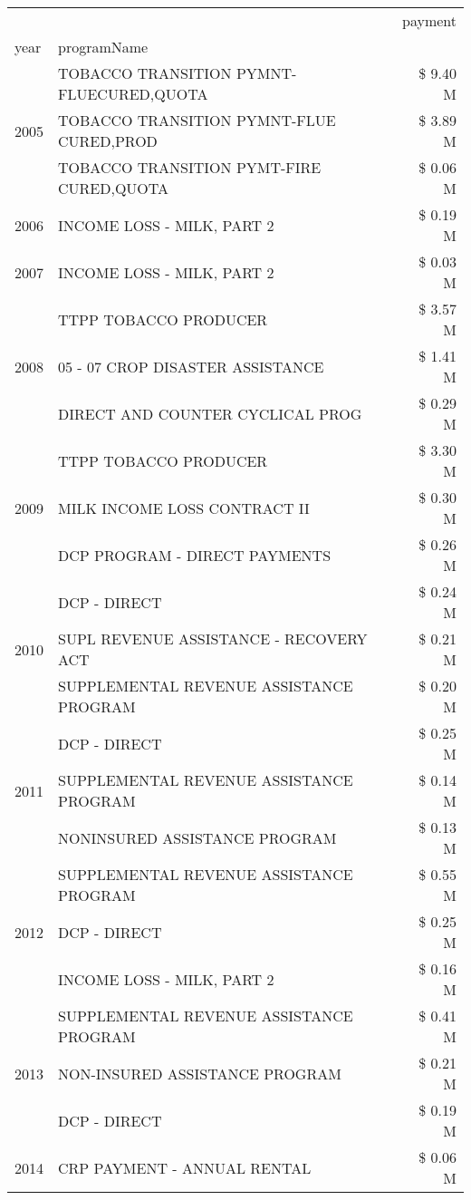 \begin{tabular}{llr}
\toprule
 &  & payment \\
year & programName &  \\
\midrule
\multirow[t]{3}{*}{2005} & TOBACCO TRANSITION PYMNT-FLUECURED,QUOTA & \$ 9.40 M \\
 & TOBACCO TRANSITION PYMNT-FLUE CURED,PROD & \$ 3.89 M \\
 & TOBACCO TRANSITION PYMT-FIRE CURED,QUOTA & \$ 0.06 M \\
\cline{1-3}
2006 & INCOME LOSS - MILK, PART 2 & \$ 0.19 M \\
\cline{1-3}
2007 & INCOME LOSS - MILK, PART 2 & \$ 0.03 M \\
\cline{1-3}
\multirow[t]{3}{*}{2008} & TTPP TOBACCO PRODUCER & \$ 3.57 M \\
 & 05 - 07 CROP DISASTER ASSISTANCE & \$ 1.41 M \\
 & DIRECT AND COUNTER CYCLICAL PROG & \$ 0.29 M \\
\cline{1-3}
\multirow[t]{3}{*}{2009} & TTPP TOBACCO PRODUCER & \$ 3.30 M \\
 & MILK INCOME LOSS CONTRACT II & \$ 0.30 M \\
 & DCP PROGRAM - DIRECT PAYMENTS & \$ 0.26 M \\
\cline{1-3}
\multirow[t]{3}{*}{2010} & DCP - DIRECT & \$ 0.24 M \\
 & SUPL REVENUE ASSISTANCE - RECOVERY ACT & \$ 0.21 M \\
 & SUPPLEMENTAL REVENUE ASSISTANCE PROGRAM & \$ 0.20 M \\
\cline{1-3}
\multirow[t]{3}{*}{2011} & DCP - DIRECT & \$ 0.25 M \\
 & SUPPLEMENTAL REVENUE ASSISTANCE PROGRAM & \$ 0.14 M \\
 & NONINSURED ASSISTANCE PROGRAM & \$ 0.13 M \\
\cline{1-3}
\multirow[t]{3}{*}{2012} & SUPPLEMENTAL REVENUE ASSISTANCE PROGRAM & \$ 0.55 M \\
 & DCP - DIRECT & \$ 0.25 M \\
 & INCOME LOSS - MILK, PART 2 & \$ 0.16 M \\
\cline{1-3}
\multirow[t]{3}{*}{2013} & SUPPLEMENTAL REVENUE ASSISTANCE PROGRAM & \$ 0.41 M \\
 & NON-INSURED ASSISTANCE PROGRAM & \$ 0.21 M \\
 & DCP - DIRECT & \$ 0.19 M \\
\cline{1-3}
\multirow[t]{3}{*}{2014} & CRP PAYMENT - ANNUAL RENTAL & \$ 0.06 M \\

\end{tabular}
